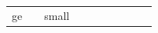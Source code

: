 \documentclass[12]{article}
\begin{document}
\begin{table}[hbtp]
\begin{tabular}{p{1.5cm}l c  p{2cm} c cc l c p{4cm}}
ge} && \hspace{0.8cm} small\\
\end{tabular}
\label{tbl:bin2}
\end{table}
\end{document}
